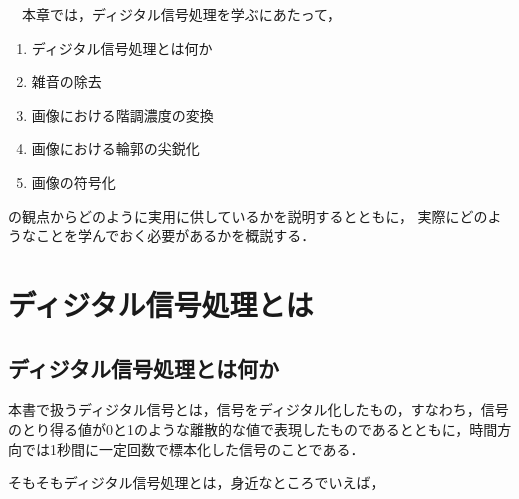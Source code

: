 

\begin{lead}
　本章では，ディジタル信号処理を学ぶにあたって，
\begin{enumerate}
\item ディジタル信号処理とは何か
\item 雑音の除去
\item 画像における階調濃度の変換
\item 画像における輪郭の尖鋭化
\item 画像の符号化
\end{enumerate}
の観点からどのように実用に供しているかを説明するとともに，
実際にどのようなことを学んでおく必要があるかを概説する．


\vfill


\end{lead}


\chapter{ディジタル信号処理とは}

\label{chapter:intro}

\section{ディジタル信号処理とは何か}

本書で扱うディジタル信号とは，信号をディジタル化したもの，すなわち，信号のとり得る値が0と1のような離散的な値で表現したものであるとともに，時間方向では1秒間に一定回数で標本化した信号のことである．

そもそもディジタル信号処理とは，身近なところでいえば，

